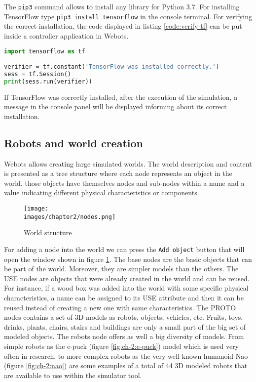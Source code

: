 The \verb|pip3| command allows to install any library for Python 3.7. For installing TensorFlow type \verb|pip3 install tensorflow| in the console terminal. For verifying the correct installation, the code displayed in listing \ref{code:verify-tf} can be put inside a controller application in Webots.

\begin{lstlisting}[language=Python, caption=Verify correct installation of TensorFlow, label=code:verify-tf]
import tensorflow as tf

verifier = tf.constant('TensorFlow was installed correctly.')
sess = tf.Session()
print(sess.run(verifier))
\end{lstlisting}

If TensorFlow was correctly installed, after the execution of the simulation, a message in the console panel will be displayed informing about its correct installation.


\subsection{Robots and world creation}

Webots allows creating large simulated worlds. The world description and content is presented as a tree structure where each node represents an object in the world, those objects have themselves nodes and sub-nodes within a name and a value indicating different physical characteristics or components. 

\begin{figure}[h!]
  \centering
  \texttt{[image: \\images/chapter2/nodes.png]}
  \caption{World structure}
  \label{fig:ch-2:nodes}
\end{figure}

For adding a node into the world we can press the \verb|Add object| button that will open the window shown in figure \ref{fig:ch-2:nodes}. The base nodes are the basic objects that can be part of the world. Moreover, they are simpler models than the others. The USE nodes are objects that were already created in the world and can be reused. For instance, if a wood box was added into the world with some specific physical characteristics, a name can be assigned to its USE attribute and then it can be reused instead of creating a new one with same characteristics. The PROTO nodes contains a set of 3D models as robots, objects, vehicles, etc. Fruits, toys, drinks, plants, chairs, stairs and buildings are only a small part of the big set of modeled objects. The robots node offers as well a big diversity of models. From simple robots as the e-puck (figure \ref{fig:ch-2:e-puck}) model which is used very often in research, to more complex robots as the very well known humanoid Nao (figure \ref{fig:ch-2:nao}) are some examples of a total of 44 3D modeled robots that are available to use within the simulator tool. 

